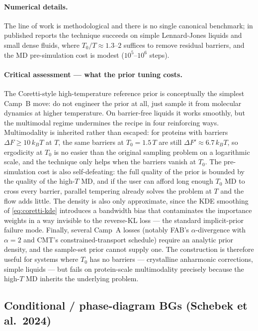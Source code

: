 \documentclass[11pt,letterpaper]{article}
\theoremstyle{plain}
\begin{document}
\paragraph{Numerical details.} The line of work is methodological and
there is no single canonical benchmark; in published reports the technique
succeeds on simple Lennard-Jones liquids and small dense fluids, where
$T_0/T\approx 1.3$--$2$ suffices to remove residual barriers, and the MD
pre-simulation cost is modest ($10^5$--$10^6$ steps).

\paragraph{Critical assessment --- what the prior tuning costs.} The
Coretti-style high-temperature reference prior is conceptually the simplest
Camp~B move: do not engineer the prior at all, just sample it from molecular
dynamics at higher temperature. On barrier-free liquids it works smoothly,
but the multimodal regime undermines the recipe in four reinforcing ways.
Multimodality is inherited rather than escaped: for proteins with barriers
$\Delta F\geq 10\,k_BT$ at $T$, the same barriers at $T_0=1.5\,T$ are still
$\Delta F'\approx 6.7\,k_BT$, so ergodicity at $T_0$ is no easier than the
original sampling problem on a logarithmic scale, and the technique only
helps when the barriers vanish at $T_0$. The pre-simulation cost is also
self-defeating: the full quality of the prior is bounded by the quality of
the high-$T$ MD, and if the user can afford long enough $T_0$ MD to cross
every barrier, parallel tempering already solves the problem at $T$ and the
flow adds little. The density is also only approximate, since the
KDE smoothing of \eqref{eq:coretti-kde} introduces a bandwidth bias that
contaminates the importance weights in a way invisible to the reverse-KL
loss --- the standard implicit-prior failure mode. Finally, several Camp~A
losses (notably FAB's $\alpha$-divergence with $\alpha=2$ and CMT's
constrained-transport schedule) require an analytic prior density, and the
sample-set prior cannot supply one. The construction is therefore useful for
systems where $T_0$ has no barriers --- crystalline anharmonic corrections,
simple liquids --- but fails on protein-scale multimodality precisely because
the high-$T$ MD inherits the underlying problem.

\subsection{Conditional / phase-diagram BGs (Schebek et al.\ 2024)}
\label{sec:schebek}
\end{document}

